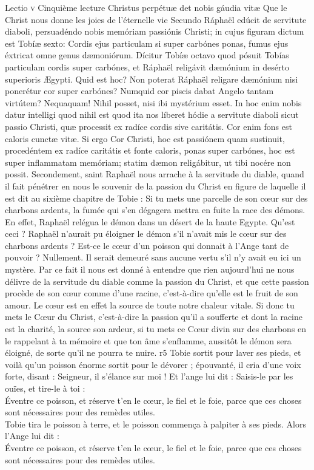 \documentclass[twoside]{article}
\begin{document}
\begin{paracol}[1]{2}
\lectioresponsorium
	{Lectio \textsc{v}}
	{Cinquième lecture}
	{Christus perpétuæ det nobis gáudia vitæ}
	{Que le Christ nous donne les joies de l'éternelle vie}
	{
		Secundo Ráphaël edúcit de servitute diaboli, persuadéndo nobis memóriam passiónis Christi; in cujus figuram dictum est Tobíæ sexto: Cordis ejus particulam si super carbónes ponas, fumus ejus éxtricat omne genus dæmoniórum. Dícitur Tobíæ octavo quod pósuit Tobías particulam cordis super carbónes, et Ráphaël religávit dæmónium in desérto superioris Ægypti. Quid est hoc? Non poterat Ráphaël religare dæmónium nisi ponerétur cor super carbónes? Numquid cor piscis dabat Angelo tantam virtútem? Nequaquam! Nihil posset, nisi ibi mystérium esset. In hoc enim nobis datur intelligi quod nihil est quod ita nos líberet hódie a servitute diaboli sicut passio Christi, quæ processit ex radíce cordis sive caritátis. Cor enim fons est caloris cunctæ vitæ. Si ergo Cor Christi, hoc est passiónem quam sustinuit, procedéntem ex radíce caritátis et fonte caloris, ponas super carbónes, hoc est super inflammatam memóriam; statim dæmon religábitur, ut tibi nocére non possit.
	}
	{
		Secondement, saint Raphaël nous arrache à la servitude du diable, quand il fait pénétrer en nous le souvenir de la passion du Christ en figure de laquelle il est dit au sixième chapitre de Tobie : Si tu mets une parcelle de son cœur sur des charbons ardents, la fumée qui s’en dégagera mettra en fuite la race des démons. En effet, Raphaël relégua le démon dans un désert de la haute Egypte. Qu’est ceci ? Raphaël n’aurait pu éloigner le démon s’il n’avait mis le cœur sur des charbons ardents ? Est-ce le cœur d’un poisson qui donnait à l’Ange tant de pouvoir ? Nullement. Il serait demeuré sans aucune vertu s’il n’y avait eu ici un mystère. Par ce fait il nous est donné à entendre que rien aujourd’hui ne nous délivre de la servitude du diable comme la passion du Christ, et que cette passion procède de son cœur comme d’une racine, c’est-à-dire qu’elle est le fruit de son amour. Le cœur est en effet la source de toute notre chaleur vitale. Si donc tu mets le Cœur du Christ, c’est-à-dire la passion qu’il a soufferte et dont la racine est la charité, la source son ardeur, si tu mets ce Cœur divin sur des charbons en le rappelant à ta mémoire et que ton âme s’enflamme, aussitôt le démon sera éloigné, de sorte qu’il ne pourra te nuire.
	}
	{r5}
	{\newpage
	\rr Tobie sortit pour laver ses pieds, et voilà qu’un poisson énorme sortit pour le dévorer ; épouvanté, il cria d’une voix forte, disant : Seigneur, il s’élance sur moi ! Et l’ange lui dit : Saisis-le par les ouïes, et tire-le à toi :\\
	\GreSpecial{*} Éventre ce poisson, et réserve t’en le cœur, le fiel et le foie, parce que ces choses sont nécessaires pour des remèdes utiles.\\
	\vv Tobie tira le poisson à terre, et le poisson commença à palpiter à ses pieds. Alors l’Ange lui dit :\\
	\GreSpecial{*} Éventre ce poisson, et réserve t’en le cœur, le fiel et le foie, parce que ces choses sont nécessaires pour des remèdes utiles.}
	

\end{paracol}
\end{document}
